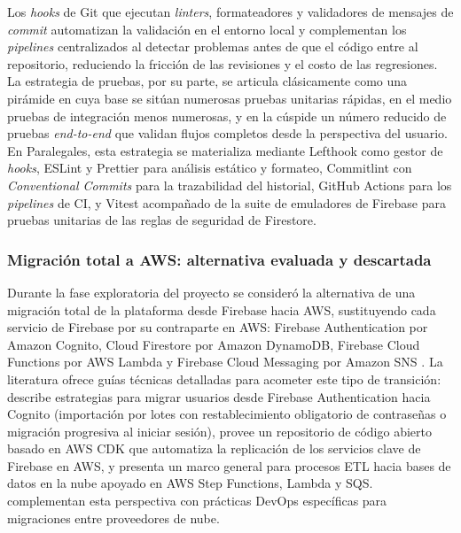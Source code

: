 Los \textit{hooks} de Git que ejecutan \textit{linters}, formateadores y validadores de mensajes de \textit{commit} automatizan la validación en el entorno local y complementan los \textit{pipelines} centralizados al detectar problemas antes de que el código entre al repositorio, reduciendo la fricción de las revisiones y el costo de las regresiones. La estrategia de pruebas, por su parte, se articula clásicamente como una pirámide en cuya base se sitúan numerosas pruebas unitarias rápidas, en el medio pruebas de integración menos numerosas, y en la cúspide un número reducido de pruebas \textit{end-to-end} que validan flujos completos desde la perspectiva del usuario. En Paralegales, esta estrategia se materializa mediante Lefthook como gestor de \textit{hooks}, ESLint y Prettier para análisis estático y formateo, Commitlint con \textit{Conventional Commits} para la trazabilidad del historial, GitHub Actions para los \textit{pipelines} de CI, y Vitest acompañado de la suite de emuladores de Firebase para pruebas unitarias de las reglas de seguridad de Firestore.

\subsubsection{Migración total a AWS: alternativa evaluada y descartada}

Durante la fase exploratoria del proyecto se consideró la alternativa de una migración total de la plataforma desde Firebase hacia AWS, sustituyendo cada servicio de Firebase por su contraparte en AWS: Firebase Authentication por Amazon Cognito, Cloud Firestore por Amazon DynamoDB, Firebase Cloud Functions por AWS Lambda y Firebase Cloud Messaging por Amazon SNS \cite{Michael2021}. La literatura ofrece guías técnicas detalladas para acometer este tipo de transición: \textcite{Hall2017} describe estrategias para migrar usuarios desde Firebase Authentication hacia Cognito (importación por lotes con restablecimiento obligatorio de contraseñas o migración progresiva al iniciar sesión), \textcite{Shank2021} provee un repositorio de código abierto basado en AWS CDK que automatiza la replicación de los servicios clave de Firebase en AWS, y \textcite{Kansara2024} presenta un marco general para procesos ETL hacia bases de datos en la nube apoyado en AWS Step Functions, Lambda y SQS. \textcite{Kyadasu2025} complementan esta perspectiva con prácticas DevOps específicas para migraciones entre proveedores de nube.

